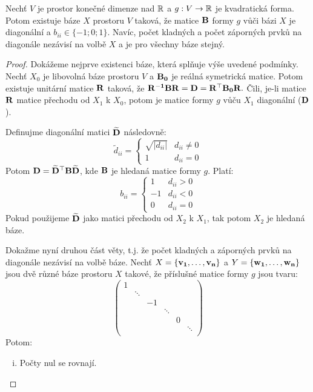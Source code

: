 \begin{theorem}
    Nechť $V$ je prostor konečné dimenze nad $\mathbb{R}$ a $g: V \rightarrow \mathbb{R}$
    je kvadratická forma. Potom existuje báze $X$ prostoru $V$ taková, že
    matice $\mathbf{B}$ formy $g$ vůči bázi $X$ je diagonální a $b_{ii} \in
    \{-1;0;1\}$. 
    Navíc, počet kladných a počet záporných prvků na diagonále nezávisí
    na volbě $X$ a je pro všechny báze stejný.
\end{theorem}

\begin{proof}
    Dokážeme nejprve existenci báze, která splňuje výše uvedené podmínky.
    Nechť $X_0$ je libovolná báze prostoru $V$ a $\mathbf{B_0}$ je reálná 
    symetrická matice. Potom existuje unitární matice $\mathbf{R}$ taková, že 
    $\mathbf{R^{-1}} \mathbf{B} \mathbf{R} = \mathbf{D} = \mathbf{R}^{\top} \mathbf{B_0} \mathbf{R}.$ Čili, je-li matice $\mathbf{R}$
    matice přechodu od $X_1$ k $X_0$, potom je matice formy $g$ vůču $X_1$
    diagonální ($\mathbf{D}$).

    Definujme diagonální matici $\mathbf{\widetilde{D}}$ následovně:
    $$\widetilde{d}_{ii} = \begin{cases}
        \sqrt{|d_{ii}|} &d_{ii} \neq 0 \\
                      1 &d_{ii} = 0
    \end{cases}$$
    Potom $\mathbf{D} = \mathbf{\widetilde{D}}^\top\mathbf{B}\mathbf{\widetilde{D}}$, kde $\mathbf{B}$
    je hledaná matice formy $g$. Platí:
    $$b_{ii} = \begin{cases}
        1 &d_{ii} > 0 \\
       -1 &d_{ii} < 0 \\
        0 &d_{ii} = 0
    \end{cases}$$
    Pokud použijeme $\mathbf{\widetilde{D}}$ jako matici přechodu od $X_2$ k 
    $X_1$, tak potom $X_2$ je hledaná báze.

    Dokažme nyní druhou část věty, t.j. že  počet kladných a záporných 
    prvků na diagonále nezávisí na volbě báze. Nechť $X = \{\mathbf{v_1}, \dots,
    \mathbf{v_n}\}$ a $Y = \{\mathbf{w_1}, \dots, \mathbf{w_n}\}$ jsou dvě různé báze prostoru
    $X$ takové, že příslušné matice formy $g$ jsou tvaru: 
    $$\begin{pmatrix}
        1 \\
        &\ddots \\
        & &-1 \\
        & & &\ddots \\
        & & & &0 \\
        & & & & &\ddots \\
    \end{pmatrix}$$
    Potom:
    \begin{enumerate}[i.]
        \item Počty nul se rovnají.
            

\end{enumerate}
\end{proof}
